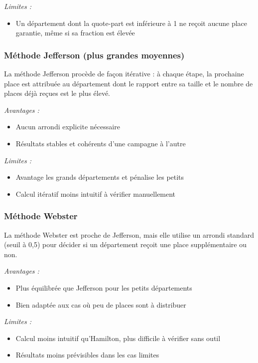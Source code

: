 \textit{Limites :}
\begin{itemize}
  \item Un département dont la quote-part est inférieure à 1 ne reçoit
        aucune place garantie, même si sa fraction est élevée
\end{itemize}

\subsubsection{Méthode Jefferson (plus grandes moyennes)}

La méthode Jefferson procède de façon itérative : à chaque étape, la
prochaine place est attribuée au département dont le rapport entre sa
taille et le nombre de places déjà reçues est le plus élevé.

\textit{Avantages :}
\begin{itemize}
  \item Aucun arrondi explicite nécessaire
  \item Résultats stables et cohérents d'une campagne à l'autre
\end{itemize}

\textit{Limites :}
\begin{itemize}
  \item Avantage les grands départements et pénalise les petits
  \item Calcul itératif moins intuitif à vérifier manuellement
\end{itemize}

\subsubsection{Méthode Webster}

La méthode Webster est proche de Jefferson, mais elle utilise un arrondi
standard (seuil à 0,5) pour décider si un département reçoit une place
supplémentaire ou non.

\textit{Avantages :}
\begin{itemize}
  \item Plus équilibrée que Jefferson pour les petits départements
  \item Bien adaptée aux cas où peu de places sont à distribuer
\end{itemize}

\textit{Limites :}
\begin{itemize}
  \item Calcul moins intuitif qu'Hamilton, plus difficile à vérifier
        sans outil
  \item Résultats moins prévisibles dans les cas limites
\end{itemize}


